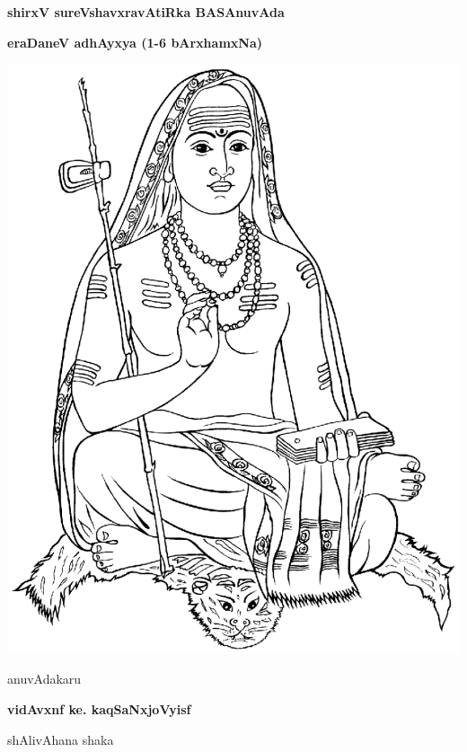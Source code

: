 \thispagestyle{empty}
\begin{center}
{\Huge\bfseries shirxV sureVshavxravAtiRka BASAnuvAda}
\bigskip

{\Large\bfseries eraDaneV adhAyxya (1-6 bArxhamxNa)}
\bigskip

\vfill

\includegraphics[scale=0.7]{figures/shankaracharya.eps}

\vfill

anuvAdakaru
\smallskip

{\large\bfseries vidAvxnf ke. kaqSaNxjoVyisf}

\smallskip
shAlivAhana shaka

\end{center}
